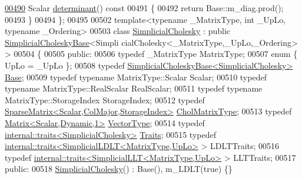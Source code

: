 \begin{DoxyCode}
\hyperlink{group___sparse_cholesky___module_aa25042f3b49880f5e487d468ea20b1b7}{00490}     Scalar \hyperlink{group___sparse_cholesky___module_aa25042f3b49880f5e487d468ea20b1b7}{determinant}()\textcolor{keyword}{ const}
00491 \textcolor{keyword}{    }\{
00492       \textcolor{keywordflow}{return} Base::m\_diag.prod();
00493     \}
00494 \};
00495 
00502 \textcolor{keyword}{template}<\textcolor{keyword}{typename} \_MatrixType, \textcolor{keywordtype}{int} \_UpLo, \textcolor{keyword}{typename} \_Ordering>
00503     \textcolor{keyword}{class }\hyperlink{group___sparse_cholesky___module_class_eigen_1_1_simplicial_cholesky}{SimplicialCholesky} : \textcolor{keyword}{public} \hyperlink{group___sparse_cholesky___module_class_eigen_1_1_simplicial_cholesky_base}{SimplicialCholeskyBase}<Simpli
      cialCholesky<\_MatrixType,\_UpLo,\_Ordering> >
00504 \{
00505 \textcolor{keyword}{public}:
00506     \textcolor{keyword}{typedef} \_MatrixType MatrixType;
00507     \textcolor{keyword}{enum} \{ UpLo = \_UpLo \};
00508     \textcolor{keyword}{typedef} \hyperlink{group___sparse_cholesky___module_class_eigen_1_1_simplicial_cholesky_base}{SimplicialCholeskyBase<SimplicialCholesky>} 
      \hyperlink{group___sparse_cholesky___module_class_eigen_1_1_simplicial_cholesky_base}{Base};
00509     \textcolor{keyword}{typedef} \textcolor{keyword}{typename} MatrixType::Scalar Scalar;
00510     \textcolor{keyword}{typedef} \textcolor{keyword}{typename} MatrixType::RealScalar RealScalar;
00511     \textcolor{keyword}{typedef} \textcolor{keyword}{typename} MatrixType::StorageIndex StorageIndex;
00512     \textcolor{keyword}{typedef} \hyperlink{group___sparse_core___module}{SparseMatrix<Scalar,ColMajor,StorageIndex>} 
      \hyperlink{group___sparse_core___module}{CholMatrixType};
00513     \textcolor{keyword}{typedef} \hyperlink{group___core___module}{Matrix<Scalar,Dynamic,1>} \hyperlink{group___core___module}{VectorType};
00514     \textcolor{keyword}{typedef} \hyperlink{struct_eigen_1_1internal_1_1traits}{internal::traits<SimplicialCholesky>} 
      \hyperlink{struct_eigen_1_1internal_1_1traits}{Traits};
00515     \textcolor{keyword}{typedef} \hyperlink{struct_eigen_1_1internal_1_1traits}{internal::traits<SimplicialLDLT<MatrixType,UpLo>}
       > LDLTTraits;
00516     \textcolor{keyword}{typedef} \hyperlink{struct_eigen_1_1internal_1_1traits}{internal::traits<SimplicialLLT<MatrixType,UpLo>} 
       > LLTTraits;
00517   \textcolor{keyword}{public}:
00518     \hyperlink{group___sparse_cholesky___module_class_eigen_1_1_simplicial_cholesky}{SimplicialCholesky}() : Base(), m\_LDLT(\textcolor{keyword}{true}) \{\}

\end{DoxyCode}
